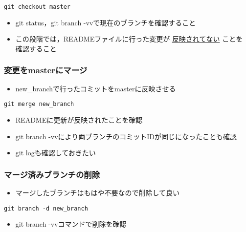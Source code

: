\documentclass[a4paper,twoside,twocolumn]{bxjsarticle}
\begin{document}
\begin{verbatim}
git checkout master
\end{verbatim}

\begin{itemize}
\item git status，git branch -vvで現在のブランチを確認すること
\item この段階では，READMEファイルに行った変更が \uline{反映されてない} ことを
確認すること
\end{itemize}

\subsubsection{変更をmasterにマージ}
\label{sec-1-6-7}
\begin{itemize}
\item new\_branchで行ったコミットをmasterに反映させる
\end{itemize}

\begin{verbatim}
git merge new_branch
\end{verbatim}

\begin{itemize}
\item READMEに更新が反映されたことを確認
\item git branch -vvにより両ブランチのコミットIDが同じになったことも確認
\item git logも確認しておきたい
\end{itemize}

\subsubsection{マージ済みブランチの削除}
\label{sec-1-6-8}

\begin{itemize}
\item マージしたブランチはもはや不要なので削除して良い
\end{itemize}

\begin{verbatim}
git branch -d new_branch
\end{verbatim}

\begin{itemize}
\item git branch -vvコマンドで削除を確認
\end{itemize}
\end{document}
